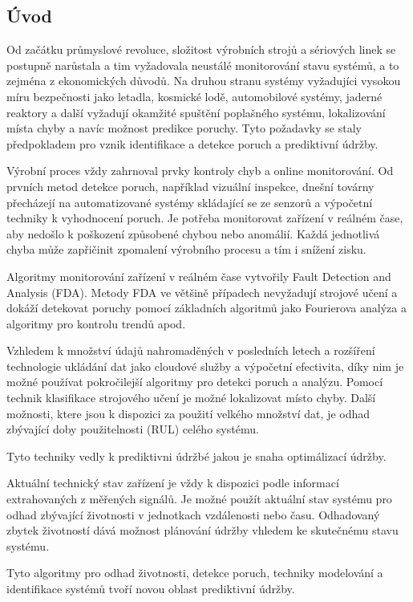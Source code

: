 \subsection*{Úvod} 

Od začátku průmyslové revoluce, složitost výrobních strojů a sériových
linek se postupně narůstala a tim vyžadovala neustálé monitorování stavu
systémů, a to zejména z ekonomických důvodů.  Na druhou stranu systémy
vyžadujíci vysokou míru bezpečnosti jako letadla, kosmické lodě,
automobilové systémy, jaderné reaktory a další vyžadují okamžité spuštění
poplašného systému, lokalizování místa chyby a navíc možnost predikce
poruchy. Tyto požadavky se staly předpokladem pro vznik 
identifikace a detekce poruch a prediktivní údržby.

Výrobní proces vždy zahrnoval prvky kontroly chyb a online
monitorování. Od prvních metod detekce poruch, například vizuální
inspekce, dnešní továrny přecházejí na automatizované systémy skládající se
ze
senzorů a výpočetní techniky k vyhodnocení poruch.
Je potřeba monitorovat zařízení v reálném čase, aby nedošlo k poškození
způsobené chybou nebo anomálií. Každá jednotlivá chyba může zapřičinit zpomalení
výrobního procesu a tím i snížení zisku.

Algoritmy monitorování zařízení v reálném čase vytvořily Fault Detection
and Analysis (FDA). Metody FDA ve většině případech nevyžadují strojové
učení a dokáží detekovat poruchy pomocí základních algoritmů
jako Fourierova analýza a algoritmy pro kontrolu trendů apod.

Vzhledem k množství údajů nahromaděných v posledních letech a rozšíření
technologie ukládání dat jako cloudové služby a výpočetní efectivita, díky
nim je možné používat pokročilejší algoritmy pro detekci poruch a
analýzu. Pomocí technik klasifikace strojového učení je možné
lokalizovat místo chyby. Další možnosti, ktere jsou k dispozici za použití
velkého množství dat, je odhad zbývající doby použitelnosti (RUL) celého
systému. 

Tyto techniky vedly k prediktivni údržbé jakou je snaha optimálizací údržby.

Aktuální technický stav zařízení je vždy k dispozici podle informací
extrahovaných z měřených signálů. Je možné použít aktuální stav systému
pro odhad zbývající životnosti v jednotkach vzdálenosti nebo času. Odhadovaný zbytek
životností dává možnost plánování údržby vhledem ke skutečnému stavu systému.

Tyto algoritmy pro odhad životnosti, detekce poruch, techniky modelování a
identifikace systémů tvoří novou oblast prediktivní údržby.

